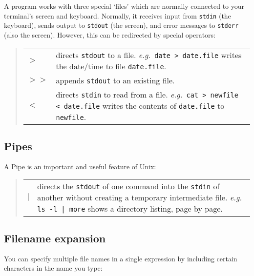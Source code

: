 A program works with three special `files' which are normally connected to your
terminal's screen and keyboard.
Normally, it receives input from {\tt stdin} (the keyboard), sends output to
{\tt stdout} (the screen), and error messages to {\tt stderr} (also the screen).
However, this can be redirected by special operators:
\begin{quote}
\begin{tabular}{lp{5.4in}}

{\tt $>$} & directs {\tt stdout} to a file.
           {\em e.g.}\, {\tt date > date.file} writes the date/time to file
            {\tt date.file}.\\

{\tt  $>>$} & appends {\tt stdout} to an existing file.\\

{\tt  $<$} & directs {\tt stdin} to read from a file.
            {\em e.g.}\, {\tt cat > newfile < date.file} writes the contents of
             {\tt date.file} to {\tt newfile}.

\end{tabular}
\end{quote}

\subsection{Pipes}

A Pipe is an important and useful feature of Unix:
\begin{quote}
\begin{tabular}{lp{5.4in}}

{\tt  $\mid$} & directs the {\tt stdout} of one command into
  the {\tt stdin} of another without creating a temporary intermediate file.
  {\em e.g.}\, {\tt ls -l | more} shows a directory listing, page by page.

\end{tabular}
\end{quote}

\subsection{Filename expansion}

You can specify multiple file names in a single expression by including
certain characters in the name you type:

